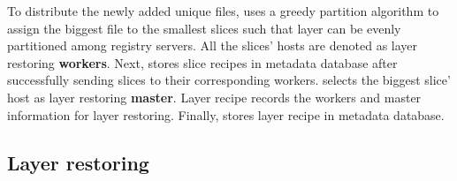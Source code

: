

To distribute the newly added unique files,
\sysname uses a greedy partition algorithm to 
assign the biggest file to the smallest slices
such that layer can be evenly partitioned among registry servers.
All the slices' hosts are denoted as layer restoring \textbf{workers}. 
Next, \sysname stores slice recipes in metadata database after successfully
sending slices to their corresponding workers.
\sysname selects the biggest slice' host as layer restoring \textbf{master}.
Layer recipe records the workers and master information for layer restoring.
Finally, \sysname stores layer recipe in metadata database.




\subsection{Layer restoring}

